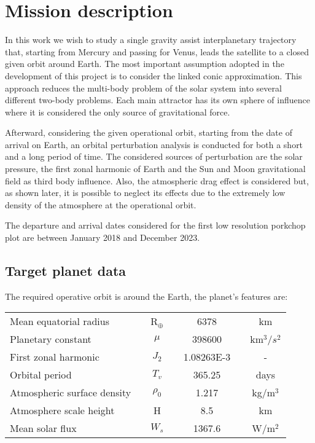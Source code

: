 
\chapter{Mission description}
\label{s:mission}

In this work we wish to study a single gravity assist interplanetary trajectory that, starting from Mercury and passing for Venus, leads the satellite to a closed given orbit around Earth. The most important assumption adopted in the development of this project is to consider the linked conic approximation. This approach reduces the multi-body problem of the solar system into several different two-body problems. Each main attractor has its own sphere of influence where it is considered the only source of gravitational force.

Afterward, considering the given operational orbit, starting from the date of arrival on Earth, an orbital perturbation analysis is conducted for both a short and a long period of time. The considered sources of perturbation are the solar pressure, the first zonal harmonic of Earth and the Sun and Moon gravitational field as third body influence. Also, the atmospheric drag effect is considered but, as shown later, it is possible to neglect its effects due to the extremely low density of the atmosphere at the operational orbit.

The departure and arrival dates considered for the first low resolution porkchop plot are between January 2018 and December 2023.

\section{Target planet data}
The required operative orbit is around the Earth, the planet's features are:
\begin{table}[h]
\begin{tabular}{lcccccc}
Mean equatorial radius 		&& R$_\oplus$ 			&& 6378			&& km \\
Planetary constant 			&& $\mu $		&& 398600			&& km$^3$/$s^2$ \\
First zonal harmonic 		&& $J_2 $		&& 1.08263E-3		&& - \\
Orbital period 			&&$ T_v	$	&& 365.25			&& days \\	
Atmospheric surface density 	&&$ \rho_0$ 		&& 1.217			&& kg/m$^3$ \\
Atmosphere scale height 		&& H 			&& 8.5	 		&& km \\
Mean solar flux 			&& $W_s$		&& 1367.6 			&& W/m$^2$ \\
\end{tabular}
\end{table}


